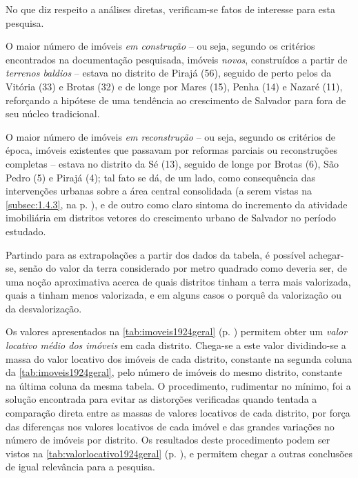 

No que diz respeito a análises diretas, verificam-se fatos de interesse para esta pesquisa.

O maior número de imóveis \textit{em construção} -- ou seja, segundo os critérios encontrados na documentação pesquisada, imóveis \textit{novos}, construídos a partir de \textit{terrenos baldios} -- estava no distrito de Pirajá (56), seguido de perto pelos da Vitória (33) e Brotas (32) e de longe por Mares (15), Penha (14) e Nazaré (11), reforçando a hipótese de uma tendência ao crescimento de Salvador para fora de seu núcleo tradicional.

O maior número de imóveis \textit{em reconstrução} -- ou seja, segundo os critérios de época, imóveis existentes que passavam por reformas parciais ou reconstruções completas -- estava no distrito da Sé (13), seguido de longe por Brotas (6), São Pedro (5) e Pirajá (4); tal fato se dá, de um lado, como consequência das intervenções urbanas sobre a área central consolidada (a serem vistas na \autoref{subsec:1.4.3}, na p. \pageref{subsec:1.4.3}), e de outro como claro sintoma do incremento da atividade imobiliária em distritos vetores do crescimento urbano de Salvador no período estudado.

Partindo para as extrapolações a partir dos dados da tabela, é possível achegar-se, senão do valor da terra considerado por metro quadrado como deveria ser, de uma noção aproximativa acerca de quais distritos tinham a terra mais valorizada, quais a tinham menos valorizada, e em alguns casos o porquê da valorização ou da desvalorização.

Os valores apresentados na \autoref{tab:imoveis1924geral} (p. \pageref{tab:imoveis1924geral}) permitem obter um \textit{valor locativo médio dos imóveis} em cada distrito. Chega-se a este valor dividindo-se a massa do valor locativo dos imóveis de cada distrito, constante na segunda coluna da \autoref{tab:imoveis1924geral}, pelo número de imóveis do mesmo distrito, constante na última coluna da mesma tabela. O procedimento, rudimentar no mínimo, foi a solução encontrada para evitar as distorções verificadas quando tentada a comparação direta entre as massas de valores locativos de cada distrito, por força das diferenças nos valores locativos de cada imóvel e das grandes variações no número de imóveis por distrito. Os resultados deste procedimento podem ser vistos na \autoref{tab:valorlocativo1924geral} (p. \pageref{tab:valorlocativo1924geral}), e permitem chegar a outras conclusões de igual relevância para a pesquisa.

